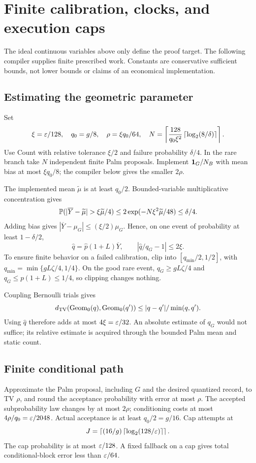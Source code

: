 \section{Finite calibration, clocks, and execution caps}
The ideal continuous variables above only define the proof target. The following compiler supplies finite prescribed work. Constants are conservative sufficient bounds, not lower bounds or claims of an economical implementation.

\subsection{Estimating the geometric parameter}
Set
\[
\xi=\varepsilon/128,\quad q_0=g/8,\quad \rho=\xi q_0/64,\quad
N=\left\lceil\frac{128}{q_0\xi^2}\left\lceil\log_2(8/\delta)\right\rceil\right\rceil.
\]
Use Count with relative tolerance $\xi/2$ and failure probability $\delta/4$. In the rare branch take $N$ independent finite Palm proposals. Implement $\mathbf 1_G/N_B$ with mean bias at most $\xi q_0/8$; the compiler below gives the smaller $2\rho$.

The implemented mean $\widetilde\mu$ is at least $q_0/2$. Bounded-variable multiplicative concentration gives
\[
\Prb(|\overline Y-\widetilde\mu|>\xi\widetilde\mu/4)
\le2\exp(-N\xi^2\widetilde\mu/48)\le\delta/4.
\]
Adding bias gives $|\overline Y-\mu_G|\le(\xi/2)\mu_G$. Hence, on one event of probability at least $1-\delta/2$,
\begin{equation}
\widehat q=\widehat p(1+L)\overline Y,\qquad
|\widehat q/q_G-1|\le2\xi. \label{eq:qhat}
\end{equation}
To ensure finite behavior on a failed calibration, clip into $[q_{\min}/2,1/2]$, with $q_{\min}=\min\{gL\zeta/4,1/4\}$. On the good rare event, $q_G\ge gL\zeta/4$ and $q_G\le p(1+L)\le1/4$, so clipping changes nothing.

Coupling Bernoulli trials gives
\[
d_{\mathrm{TV}}(\operatorname{Geom}_0(q),\operatorname{Geom}_0(q'))
\le |q-q'|/\min(q,q').
\]
Using $\widehat q$ therefore adds at most $4\xi=\varepsilon/32$.
An absolute estimate of $q_G$ would not suffice; its relative estimate is acquired through the bounded Palm mean and static count.

\subsection{Finite conditional path}
Approximate the Palm proposal, including $G$ and the desired quantized record, to TV $\rho$, and round the acceptance probability with error at most $\rho$. The accepted subprobability law changes by at most $2\rho$; conditioning costs at most $4\rho/q_0=\varepsilon/2048$. Actual acceptance is at least $q_0/2=g/16$.
Cap attempts at
\[
J=\left\lceil(16/g)\left\lceil\log_2(128/\varepsilon)\right\rceil\right\rceil.
\]
The cap probability is at most $\varepsilon/128$. A fixed fallback on a cap gives total conditional-block error less than $\varepsilon/64$.

